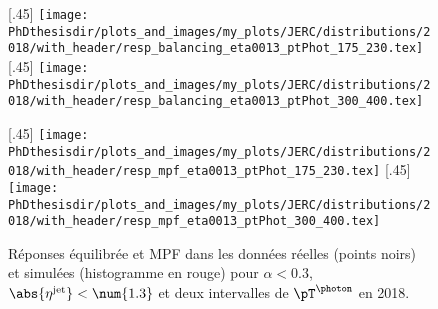 \begin{figure}[h]
\centering
\subcaptionbox{Réponse équilibrée pour $\pT^{\photon}\in[175, 230[$ \SI{}{\GeV}.\label{subfig-distrib_Gjets_18_resp_balancing_eta0013_ptPhot_175_230}}[.45\textwidth]
{\texttt{[image: \\PhDthesisdir/plots\_and\_images/my\_plots/JERC/distributions/2018/with\_header/resp\_balancing\_eta0013\_ptPhot\_175\_230.tex]}}
\hfill
\subcaptionbox{Réponse équilibrée pour $\pT^{\photon}\in[300, 400[$ \SI{}{\GeV}.\label{subfig-distrib_Gjets_18_resp_balancing_eta0013_ptPhot_300_400}}[.45\textwidth]
{\texttt{[image: \\PhDthesisdir/plots\_and\_images/my\_plots/JERC/distributions/2018/with\_header/resp\_balancing\_eta0013\_ptPhot\_300\_400.tex]}}

\vspace{.5\baselineskip}

\subcaptionbox{Réponse MPF pour $\pT^{\photon}\in[175, 230[$ \SI{}{\GeV}.\label{subfig-distrib_Gjets_18_resp_mpf_eta0013_ptPhot_175_230}}[.45\textwidth]
{\texttt{[image: \\PhDthesisdir/plots\_and\_images/my\_plots/JERC/distributions/2018/with\_header/resp\_mpf\_eta0013\_ptPhot\_175\_230.tex]}}
\hfill
\subcaptionbox{Réponse MPF pour $\pT^{\photon}\in[300, 400[$ \SI{}{\GeV}.\label{subfig-distrib_Gjets_18_resp_mpf_eta0013_ptPhot_300_400}}[.45\textwidth]
{\texttt{[image: \\PhDthesisdir/plots\_and\_images/my\_plots/JERC/distributions/2018/with\_header/resp\_mpf\_eta0013\_ptPhot\_300\_400.tex]}}

\caption[Réponses équilibrée et MPF en 2018.]{Réponses équilibrée et MPF dans les données réelles (points noirs) et simulées (histogramme en rouge) pour $\alpha<\num{0.3}$, $\abs{\eta^\text{jet}}<\num{1.3}$ et deux intervalles de $\pT^{\photon}$ en 2018.}
\label{fig-distribs_Gjets_18_resp_bal_and_mpf}
\end{figure}
